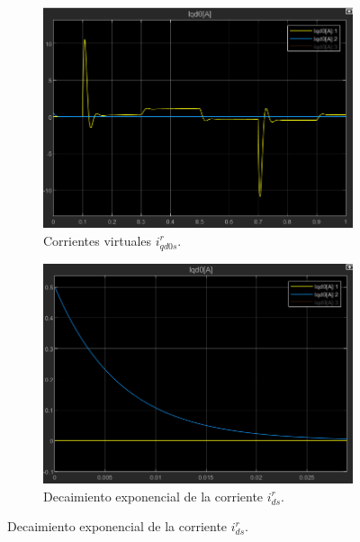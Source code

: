 \documentclass{article}
\begin{document}
\begin{figure}[H]
    \centering
    \begin{subfigure}[b]{0.42\textwidth}
        \centering
        \includegraphics[width=\textwidth]{Imagenes/CorrientesVirtuales0,5ALTIaumentado.png}
        \caption{Corrientes virtuales \(i^r_{qd0s}\).}
        \label{fig:CorrientesVirtualesId0.5ALTIaumentado}
    \end{subfigure}
    \hfill
    \begin{subfigure}[b]{0.4\textwidth}
        \centering
        \includegraphics[width=\textwidth]{Imagenes/DecaimientoCorrienteId0,5ALTIaumentado.png}
        \caption{Decaimiento exponencial de la corriente \(i^r_{ds}\).}
        \label{fig:DecaimientoCorrienteId0.5ALTIaumentado}
    \end{subfigure}
    

\end{figure}
\end{document}

